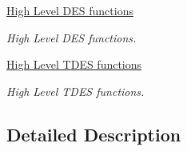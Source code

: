 \begin{DoxyCompactItemize}
\hyperlink{group___c_r_y_p___group8}{High Level D\+E\+S functions}
\begin{DoxyCompactList}\small\item\em High Level D\+E\+S functions. \end{DoxyCompactList}\item 
\hyperlink{group___c_r_y_p___group7}{High Level T\+D\+E\+S functions}
\begin{DoxyCompactList}\small\item\em High Level T\+D\+E\+S functions. \end{DoxyCompactList}\end{DoxyCompactItemize}


\subsection{Detailed Description}
